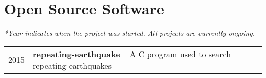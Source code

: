 \section*{Open Source Software}

\textit{*Year indicates when the project was started. All projects are currently ongoing.}

\begin{tabular}{p{} p{}}
2015 &	\textbf{\href{https://github.com/core-man/repeating-earthquake/}{repeating-earthquake}} -- A C program used to search repeating earthquakes \\
\end{tabular}

